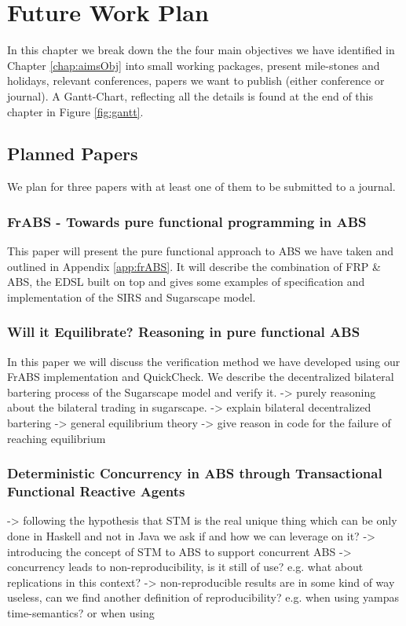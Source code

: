 \chapter{Future Work Plan}
\label{chap:future}

In this chapter we break down the the four main objectives we have identified in Chapter \ref{chap:aimsObj} into small working packages, present mile-stones and holidays, relevant conferences, papers we want to publish (either conference or journal). A Gantt-Chart, reflecting all the details is found at the end of this chapter in Figure \ref{fig:gantt}.

\section{Planned Papers}
We plan for three papers with at least one of them to be submitted to a journal.

\subsection{FrABS - Towards pure functional programming in ABS}
This paper will present the pure functional approach to ABS we have taken and outlined in Appendix \ref{app:frABS}. It will describe the combination of FRP \& ABS, the EDSL built on top and gives some examples of specification and implementation of the SIRS and Sugarscape model.

\subsection{Will it Equilibrate? Reasoning in pure functional ABS}
In this paper we will discuss the verification method we have developed using our FrABS implementation and QuickCheck. We describe the decentralized bilateral bartering process of the Sugarscape model and verify it.
-> purely reasoning about the bilateral trading in sugarscape.
	-> explain bilateral decentralized bartering
	-> general equilibrium theory
	-> give reason in code for the failure of reaching equilibrium

\subsection{Deterministic Concurrency in ABS through Transactional Functional Reactive Agents}
	-> following the hypothesis that STM is the real unique thing which can be only done in Haskell and not in Java we ask if and how we can leverage on it?
	-> introducing the concept of STM to ABS to support concurrent ABS
	-> concurrency leads to non-reproducibility, is it still of use? e.g. what about replications in this context?
	-> non-reproducible results are in some kind of way useless, can we find another definition of reproducibility? e.g. when using yampas time-semantics? or when using 

